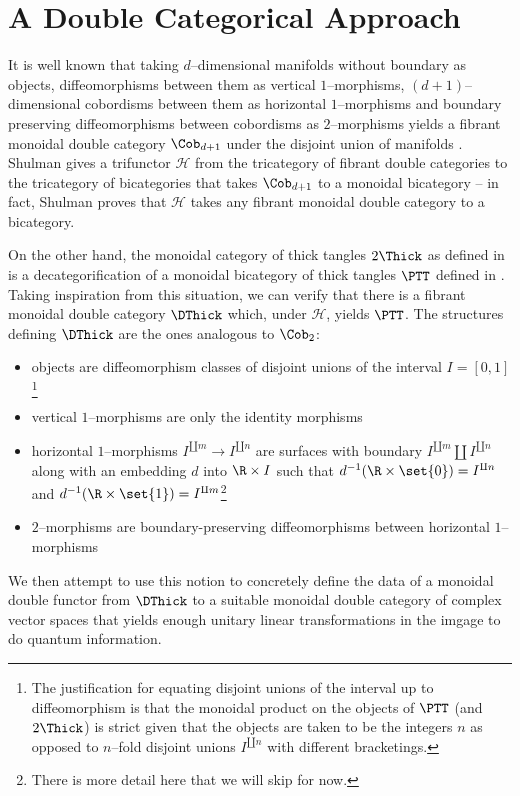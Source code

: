 \documentclass[\PRJWD/Thick_TQFTs_and_Quantum_Information.tex]{subfiles}
\begin{document}
\section{A Double Categorical Approach}

It is well known that taking $d$--dimensional manifolds without boundary as
objects, diffeomorphisms between them as vertical $1$--morphisms, $(d +
1)$--dimensional cobordisms between them as horizontal $1$--morphisms and
boundary preserving diffeomorphisms between cobordisms as $2$--morphisms yields
a fibrant monoidal double category $\Cob_{d + 1}$ under the disjoint union of
manifolds \cite{SymMonBicat}. Shulman gives a trifunctor $\mathcal{H}$ from the
tricategory of fibrant double categories to the tricategory of bicategories that
takes $\Cob_{d + 1}$ to a monoidal bicategory -- in fact, Shulman proves that
$\mathcal{H}$ takes any fibrant monoidal double category to a bicategory.

On the other hand, the monoidal category of thick tangles $2\Thick$ as defined
in \cite{NonCommTQFT} is a decategorification of a monoidal bicategory of thick
tangles $\PTT$ defined in \cite{NonSemiSimp}. Taking inspiration from this
situation, we can verify that there is a fibrant monoidal double category
$\DThick$ which, under $\mathcal{H}$, yields $\PTT$. The structures defining
$\DThick$ are the ones analogous to $\Cob_{2}$:
\begin{itemize}
\setlength{\itemsep}{0pt}
\item objects are diffeomorphism classes of disjoint unions of the interval
$I = [0, 1]$\footnote{The justification for equating disjoint unions of the
interval up to diffeomorphism is that the monoidal product on the objects of
$\PTT$ (and $2\Thick$) is strict given that the objects are taken to be the
integers $n$ as opposed to $n$--fold disjoint unions $I^{\amalg n}$ with
different bracketings.}
\item vertical $1$--morphisms are only the identity morphisms
\item horizontal $1$--morphisms $I^{\amalg m} \to I^{\amalg n}$ are surfaces
with boundary $I^{\amalg m} \amalg I^{\amalg n}$ along with an embedding $d$
into $\R \times I$ such that $d^{-1}(\R \times \set{0}) = I^{\amalg n}$ and
$d^{-1}(\R \times \set{1}) = I^{\amalg m}$\footnote{There is more detail here
that we will skip for now.}
\item $2$--morphisms are boundary-preserving diffeomorphisms between horizontal
$1$--morphisms
\end{itemize}
We then attempt to use this notion to concretely define the data of a monoidal
double functor from $\DThick$ to a suitable monoidal double category of complex
vector spaces that yields enough unitary linear transformations in the imgage to
do quantum information.
\end{document}
